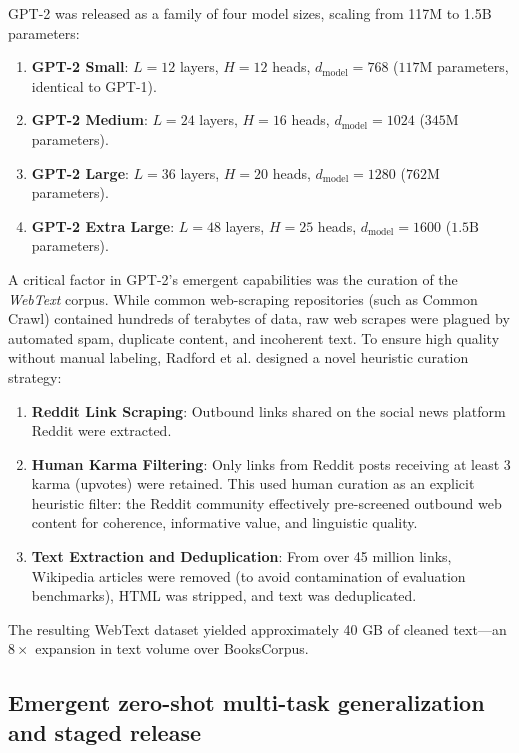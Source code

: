 \documentclass[../../../main.tex]{subfiles}
\begin{document}
GPT-2 was released as a family of four model sizes, scaling from 117M to 1.5B parameters:
\begin{enumerate}
    \item \textbf{GPT-2 Small}: $L = 12$ layers, $H = 12$ heads, $d_{\text{model}} = 768$ ($117\text{M}$ parameters, identical to GPT-1).
    \item \textbf{GPT-2 Medium}: $L = 24$ layers, $H = 16$ heads, $d_{\text{model}} = 1024$ ($345\text{M}$ parameters).
    \item \textbf{GPT-2 Large}: $L = 36$ layers, $H = 20$ heads, $d_{\text{model}} = 1280$ ($762\text{M}$ parameters).
    \item \textbf{GPT-2 Extra Large}: $L = 48$ layers, $H = 25$ heads, $d_{\text{model}} = 1600$ ($1.5\text{B}$ parameters).
\end{enumerate}

A critical factor in GPT-2's emergent capabilities was the curation of the \emph{WebText} corpus. While common web-scraping repositories (such as Common Crawl) contained hundreds of terabytes of data, raw web scrapes were plagued by automated spam, duplicate content, and incoherent text. To ensure high quality without manual labeling, Radford et al. designed a novel heuristic curation strategy:
\begin{enumerate}
    \item \textbf{Reddit Link Scraping}: Outbound links shared on the social news platform Reddit were extracted.
    \item \textbf{Human Karma Filtering}: Only links from Reddit posts receiving at least 3 karma (upvotes) were retained. This used human curation as an explicit heuristic filter: the Reddit community effectively pre-screened outbound web content for coherence, informative value, and linguistic quality.
    \item \textbf{Text Extraction and Deduplication}: From over 45 million links, Wikipedia articles were removed (to avoid contamination of evaluation benchmarks), HTML was stripped, and text was deduplicated.
\end{enumerate}
The resulting WebText dataset yielded approximately 40 GB of cleaned text—an $8\times$ expansion in text volume over BooksCorpus.


\subsection{Emergent zero-shot multi-task generalization and staged release}
\label{subsec:gpt2_zeroshot}
\end{document}
